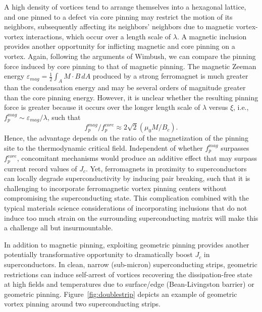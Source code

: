 \documentclass[%
 aip,
 amsmath,amssymb,
 reprint,%
floatfix]{revtex4-1}
\newcommand{\Jc}{J_{c}}
\newcommand{\Hc}{B_{c}}
\begin{document}
A high density of vortices tend to arrange themselves into a hexagonal lattice, and one pinned to a defect via core pinning may restrict the motion of its neighbors, subsequently affecting its neighbors' neighbors due to magnetic vortex-vortex interactions, which occur over a length scale of $\lambda$.  A magnetic inclusion provides another opportunity for inflicting magnetic and core pinning on a vortex. Again, following the arguments of Wimbush\cite{Wimbush2015}, we can compare the pinning force induced by core pinning to that of magnetic pinning. The magnetic Zeeman energy $\varepsilon_{mag} = \frac{1}{2} \int_{A} M \cdot B \,dA$ produced by a strong ferromagnet is much greater than the condensation energy and may be several orders of magnitude greater than the core pinning energy. However, it is unclear whether the resulting pinning force is greater because it occurs over the longer length scale of $\lambda$ versus $\xi$, i.e., $f_p^{mag} \sim \varepsilon_{mag} / \lambda$, such that
%
\begin{equation}
   f_p^{mag} / f_p^{core} \approx 2 \sqrt{2} (\mu_0 M / \Hc). 
\end{equation}
%
Hence, the advantage depends on the ratio of the magnetization of the pinning site to the thermodynamic critical field.  Independent of whether $f_p^{mag}$ surpasses $f_p^{core}$, concomitant mechanisms would produce an additive effect that may surpass current record values of $\Jc$. Yet, ferromagnets in proximity to superconductors can locally degrade superconductivity by inducing pair breaking, such that it is challenging to incorporate ferromagnetic vortex pinning centers without compromising the superconducting state. This complication combined with the typical materials science considerations of incorporating inclusions that do not induce too much strain on the surrounding superconducting matrix will make this a challenge all but insurmountable.


In addition to magnetic pinning, exploiting geometric pinning provides another potentially transformative opportunity to dramatically boost $\Jc$ in superconductors. In clean, narrow (sub-micron) superconducting strips, geometric restrictions can induce self-arrest of vortices recovering the dissipation-free state at high fields and temperatures due to surface/edge (Bean-Livingston barrier) \cite{Bean1964} or geometric \cite{Zeldov1994, Zeldov1994b, Brandt1999, Willa2014} pinning. Figure~\ref{fig:doublestrip} depicts an example of geometric vortex pinning around two superconducting strips. 
\end{document}
